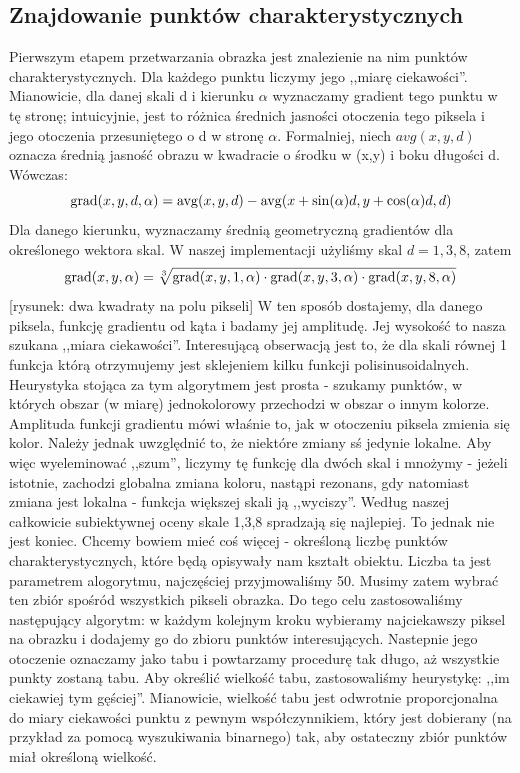 \documentclass[a4paper,12pt,leqno]{article}
\begin{document}
\subsection{Znajdowanie punktów charakterystycznych}
Pierwszym etapem przetwarzania obrazka jest znalezienie na nim punktów charakterystycznych. Dla każdego punktu liczymy jego ,,miarę ciekawości''.
Mianowicie, dla danej skali d i kierunku $\alpha$ wyznaczamy gradient tego punktu w tę stronę; 
intuicyjnie, jest to różnica średnich jasności otoczenia tego piksela i jego otoczenia przesuniętego o d w stronę $\alpha$. 
Formalniej, niech $avg(x,y,d)$ oznacza średnią jasność obrazu w kwadracie o środku w (x,y) i boku długości d. Wówczas:
\[
\mathrm{grad}(x,y,d,\alpha) = \mathrm{avg}(x,y,d) - \mathrm{avg}(x+\sin(\alpha)d, y+\cos(\alpha)d, d)
\]
Dla danego kierunku, wyznaczamy średnią geometryczną gradientów dla określonego wektora skal. W naszej implementacji użyliśmy skal $d = 1, 3, 8$, 
zatem 
\[
\mathrm{grad}(x,y,\alpha ) = \sqrt[3]{\mathrm{grad}(x,y,1,\alpha ) \cdot \mathrm{grad}(x,y,3,\alpha ) \cdot \mathrm{grad}(x,y,8,\alpha )}
\]
[rysunek: dwa kwadraty na polu pikseli]
W ten sposób dostajemy, dla danego piksela, funkcję gradientu od kąta i badamy jej amplitudę. Jej wysokość to nasza szukana ,,miara ciekawości''.
Interesującą obserwacją jest to, że dla skali równej 1 funkcja którą otrzymujemy jest sklejeniem kilku funkcji polisinusoidalnych.
Heurystyka stojąca za tym algorytmem jest prosta - szukamy punktów, w których obszar (w miarę) jednokolorowy przechodzi w obszar o innym kolorze. 
Amplituda funkcji gradientu mówi właśnie to, jak w otoczeniu piksela zmienia się kolor. 
Należy jednak uwzględnić to, że niektóre zmiany sś jedynie lokalne. Aby więc wyeleminować ,,szum'', 
liczymy tę funkcję dla dwóch skal i mnożymy - jeżeli istotnie, zachodzi globalna zmiana koloru, nastąpi rezonans, 
gdy natomiast zmiana jest lokalna - funkcja większej skali ją ,,wyciszy''. Według naszej całkowicie subiektywnej oceny skale 1,3,8 spradzają się najlepiej.
To jednak nie jest koniec. Chcemy bowiem mieć coś więcej - określoną liczbę punktów charakterystycznych, 
które będą opisywały nam kształt obiektu. Liczba ta jest parametrem alogorytmu, najczęściej przyjmowaliśmy 50. Musimy zatem wybrać ten zbiór spośród wszystkich pikseli obrazka. 
Do tego celu zastosowaliśmy następujący algorytm: w każdym kolejnym kroku wybieramy najciekawszy piksel na obrazku i dodajemy go do zbioru punktów interesujących.
Nastepnie jego otoczenie oznaczamy jako tabu i powtarzamy procedurę tak długo, aż wszystkie punkty zostaną tabu. 
Aby określić wielkość tabu, zastosowaliśmy heurystykę: ,,im ciekawiej tym gęściej''. Mianowicie, 
wielkość tabu jest odwrotnie proporcjonalna do miary ciekawości punktu z pewnym współczynnikiem, który jest dobierany (na przykład za pomocą wyszukiwania binarnego)
tak, aby ostateczny zbiór punktów miał określoną wielkość.
\end{document}
